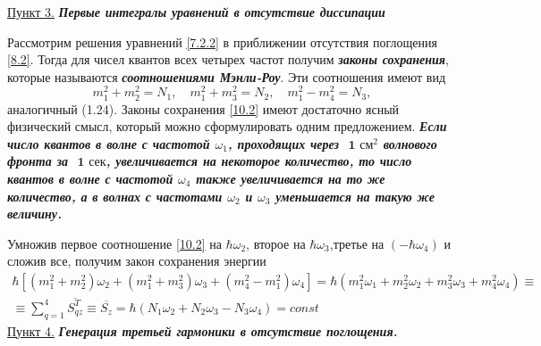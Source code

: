 \documentclass[a4paper]{article}
\begin{document}
	\underline{Пункт 3.} \textbf{\textit{Первые интегралы уравнений в отсутствие диссипации}}
	
	Рассмотрим решения уравнений \eqref{7.2.2} в приближении отсутствия поглощения  \eqref{8.2}. Тогда для чисел квантов всех четырех частот получим \textit{\textbf{законы сохранения}}, которые называются \textit{\textbf{соотношениями Мэнли-Роу}}. Эти соотношения имеют вид  
	\begin{equation}
		m_{1}^{2}+m_{2}^{2}=N_{1},\quad m_{1}^{2}+m_{3}^{2}=N_{2},\quad m_{1}^{2}-m_{4}^{2}=N_{3},
		\label{10.2}
	\end{equation}
	аналогичный (1.24). Законы сохранения \eqref{10.2} имеют достаточно ясный физический смысл, который можно сформулировать одним предложением.
	\textbf{\textit{Если число квантов в волне с частотой  $\omega_{1}$, проходящих через  $\textbf{ 1} \text{ см}^{2}$ волнового фронта за $\textbf{ 1}\text{ сек}$, увеличивается на некоторое количество, то число квантов в волне с частотой $\omega_{4}$ также увеличивается на то же количество, а в волнах с частотами $\omega_{2}$ и $\omega_{3}$ уменьшается на такую же величину.}}
	
	Умножив первое соотношение \eqref{10.2} на $\hbar\omega_{2}$, второе на $\hbar\omega_{3}$,третье на $(-\hbar\omega_{4})$ и сложив все, получим закон сохранения энергии 
	\begin{multline}
		\hbar\left[(m_{1}^{2}+m_{2}^{2})\omega_{2}+(m_{1}^{2}+m_{3}^{2})\omega_{3}+(m_{4}^{2}-m_{1}^{2})\omega_{4}\right]=\hbar\left(m_{1}^{2}\omega_{1}+m_{2}^{2}\omega_{2}+m_{3}^{2}\omega_{3}+m_{4}^{2}\omega_{4}\right)\equiv\\
		\equiv\sum_{q=1}^{4}\overline{S_{qz}^{T}}\equiv\overline{S_{z}}=\hbar(N_{1}\omega_{2}+N_{2}\omega_{3}-N_{3}\omega_{4})=const\label{11.2}
	\end{multline}
	\newpage
	\underline{Пункт 4.} \textbf{\textit{Генерация третьей гармоники в отсутствие поглощения.}}
	
\end{document}
